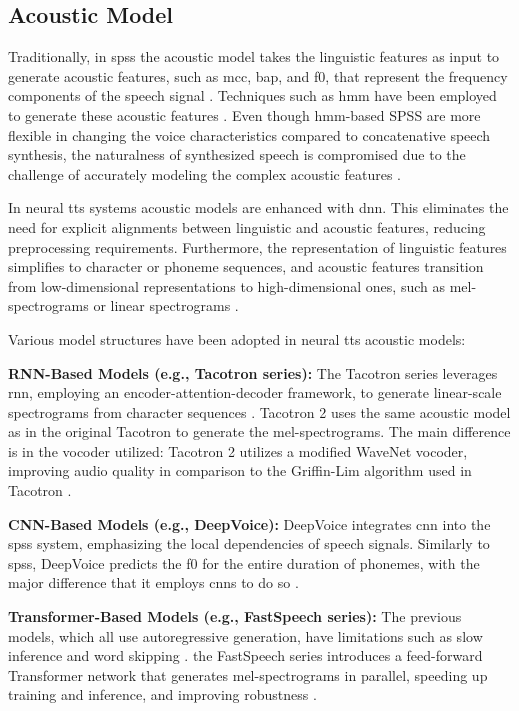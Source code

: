 \subsection{Acoustic Model}
Traditionally, in \gls{spss} the acoustic model takes the linguistic features as input to generate acoustic features, such as \gls{mcc}, \gls{bap}, and \gls{f0}, that represent the frequency components of the speech signal \cite{acoustic2023models, yoshimura1999simultaneous}. Techniques such as \gls{hmm} have been employed to generate these acoustic features \cite{tokuda2013speech}. Even though \gls{hmm}-based SPSS are more flexible in changing the voice characteristics compared to concatenative speech synthesis, the naturalness of synthesized speech is compromised due to the challenge of accurately modeling the complex acoustic features \cite{zen2015acoustic}.

In neural \gls{tts} systems acoustic models are enhanced with \gls{dnn}. This eliminates the need for explicit alignments between linguistic and acoustic features, reducing preprocessing requirements. Furthermore, the representation of linguistic features simplifies to character or phoneme sequences, and acoustic features transition from low-dimensional representations to high-dimensional ones, such as mel-spectrograms or linear spectrograms \cite{acoustic2023models}.

Various model structures have been adopted in neural \gls{tts} acoustic models:

\textbf{RNN-Based Models (e.g., Tacotron series):} The Tacotron series leverages \gls{rnn}, employing an encoder-attention-decoder framework, to generate linear-scale spectrograms from character sequences \cite{wang2017tacotron, acoustic2023models}. Tacotron 2 uses the same acoustic model as in the original Tacotron to generate the mel-spectrograms. The main difference is in the vocoder utilized: Tacotron 2 utilizes a modified WaveNet vocoder, improving audio quality in comparison to the Griffin-Lim algorithm used in Tacotron \cite{shen2018natural}.

\textbf{CNN-Based Models (e.g., DeepVoice):} DeepVoice integrates \gls{cnn} into the \gls{spss} system, emphasizing the local dependencies of speech signals. Similarly to \gls{spss}, DeepVoice predicts the \gls{f0} for the entire duration of phonemes, with the major difference that it employs \gls{cnn}s to do so \cite{arik2017deep}.

\textbf{Transformer-Based Models (e.g., FastSpeech series):} %
The previous models, which all use autoregressive generation, have limitations such as slow inference and word skipping \cite{acoustic2023models}. the FastSpeech series introduces a feed-forward Transformer network that generates mel-spectrograms in parallel, speeding up training and inference, and improving robustness \cite{ren2019fastspeech, ren2021fastspeech}.

